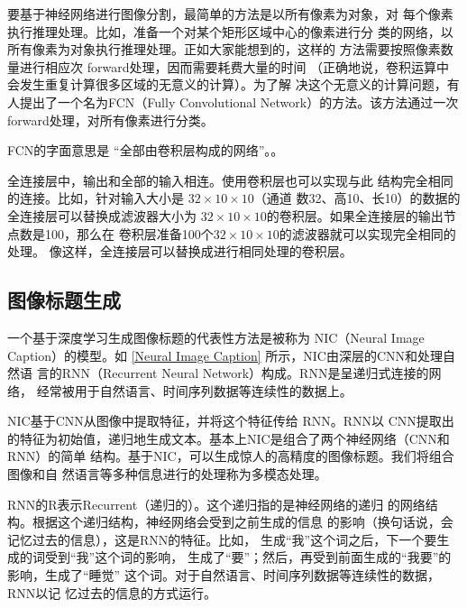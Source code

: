 要基于神经网络进行图像分割，最简单的方法是以所有像素为对象，对
每个像素执行推理处理。比如，准备一个对某个矩形区域中心的像素进行分
类的网络，以所有像素为对象执行推理处理。正如大家能想到的，这样的
方法需要按照像素数量进行相应次 forward处理，因而需要耗费大量的时间
（正确地说，卷积运算中会发生重复计算很多区域的无意义的计算）。为了解
决这个无意义的计算问题，有人提出了一个名为FCN（Fully Convolutional
Network）的方法。该方法通过一次 forward处理，对所有像素进行分类。

FCN的字面意思是 “全部由卷积层构成的网络”。。

\begin{tcolorbox}
    全连接层中，输出和全部的输入相连。使用卷积层也可以实现与此
    结构完全相同的连接。比如，针对输入大小是 $32\times10\times10$（通道
    数32、高10、长10）的数据的全连接层可以替换成滤波器大小为
    $32\times10\times10$的卷积层。如果全连接层的输出节点数是100，那么在
    卷积层准备100个$32\times10\times10$的滤波器就可以实现完全相同的处理。
    像这样，全连接层可以替换成进行相同处理的卷积层。
\end{tcolorbox}
\subsection{图像标题生成}
一个基于深度学习生成图像标题的代表性方法是被称为 NIC（Neural
Image Caption）的模型。如 \autoref{Neural Image Caption} 所示，NIC由深层的CNN和处理自然语
言的RNN（Recurrent Neural Network）构成。RNN是呈递归式连接的网络，
经常被用于自然语言、时间序列数据等连续性的数据上。


NIC基于CNN从图像中提取特征，并将这个特征传给 RNN。RNN以
CNN提取出的特征为初始值，递归地生成文本。基本上NIC是组合了两个神经网络（CNN和RNN）的简单
结构。基于NIC，可以生成惊人的高精度的图像标题。我们将组合图像和自
然语言等多种信息进行的处理称为多模态处理。

\begin{tcolorbox}
    RNN的R表示Recurrent（递归的）。这个递归指的是神经网络的递归
    的网络结构。根据这个递归结构，神经网络会受到之前生成的信息
    的影响（换句话说，会记忆过去的信息），这是RNN的特征。比如，
    生成“我”这个词之后，下一个要生成的词受到“我”这个词的影响，
    生成了“要”；然后，再受到前面生成的“我要”的影响，生成了“睡觉”
    这个词。对于自然语言、时间序列数据等连续性的数据，RNN以记
    忆过去的信息的方式运行。
\end{tcolorbox}
